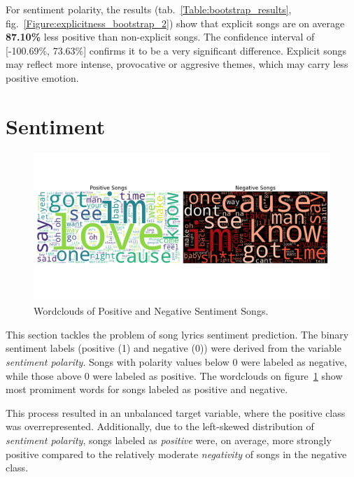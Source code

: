 For sentiment polarity, the results (tab.~\ref{Table:bootstrap_results},
fig.~\ref{Figure:explicitness_bootstrap_2}) show that explicit songs are on average
\textbf{87.10\%} less positive than non-explicit songs. The confidence interval
of [-100.69\%, 73.63\%] confirms it to be a very significant difference.
Explicit songs may reflect more intense, provocative or aggresive themes, which
may carry less positive emotion.


\section{Sentiment}
\label{sec:sentiment}
\begin{center}
\begin{figure}[H]
  \centering
  \includegraphics[width=7in]{img/wordclouds.png}
  \caption{Wordclouds of Positive and Negative Sentiment Songs.}
  \label{Figure:wordclouds}
\end{figure}
\end{center}

This section tackles the problem of song lyrics sentiment prediction. The
binary sentiment labels (positive (1) and negative (0)) were derived from the
variable \textit{sentiment polarity}. Songs with polarity values below 0 were
labeled as negative, while those above 0 were labeled as positive. The wordclouds
on figure~\ref{Figure:wordclouds} show most promiment words for 
songs labeled as positive and negative.


This process resulted in an unbalanced target variable, where the positive
class was overrepresented. Additionally, due to the left-skewed distribution of
\textit{sentiment polarity}, songs labeled as \textit{positive} were, on
average, more strongly positive compared to the relatively moderate
\textit{negativity} of songs in the negative class. 

